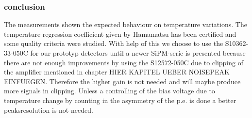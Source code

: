 \subsubsection{conclusion}
The measurements shown the expected behaviour on temperature variations. The temperature regression coefficient given by Hamamatsu has been certified and some quality criteria were studied. With help of this we choose to use the S10362-33-050C for our prototyp detectors until a newer SiPM-serie is presented because there are not enough improvements by using the S12572-050C due to clipping of the amplifier mentioned in chapter HIER KAPITEL UEBER NOISEPEAK EINFUEGEN. Therefore the higher gain is not needed and will maybe produce more signals in clipping. Unless a controlling of the bias voltage due to temperature change by counting in the asymmetry of the p.e. is done a better peaksresolution is not needed.
